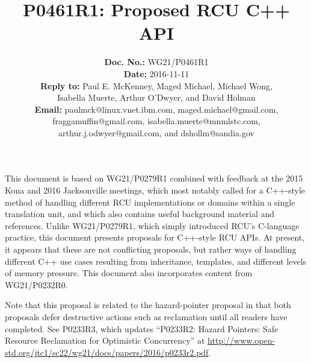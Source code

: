 \documentclass[letterpaper,10pt]{article}
\begin{document}
\newcommand{\co}[1]{\lstinline[breaklines=yes,breakatwhitespace=yes]{#1}}

\title{P0461R1: Proposed RCU C++ API}

\author{
{\bf Doc. No.: } WG21/P0461R1 \\
{\bf Date: } 2016-11-11 \\
{\bf Reply to: } Paul E. McKenney, Maged Michael, Michael Wong,\\
Isabella Muerte, Arthur O'Dwyer, and David Holman \\
{\bf Email: } paulmck@linux.vnet.ibm.com, maged.michael@gmail.com, \\
fraggamuffin@gmail.com, isabella.muerte@mnmlstc.com, \\
arthur.j.odwyer@gmail.com, and dshollm@sandia.gov
} %


\pagestyle{myheadings}

\maketitle


This document is based on WG21/P0279R1 combined with feedback at
the 2015 Kona and 2016 Jacksonville meetings, which most notably called
for a C++-style method of handling different RCU implementations or
domains within a single translation unit, and which also contains
useful background material and references.
Unlike WG21/P0279R1, which simply introduced RCU's C-language practice,
this document presents proposals for C++-style RCU APIs.
At present, it appears that these are not conflicting proposals, but
rather ways of handling different C++ use cases resulting from
inheritance, templates, and different levels of memory pressure.
This document also incorporates content from
WG21/P0232R0\cite{PaulEMcKennneyToolKitP0232R0}.

Note that this proposal is related to the hazard-pointer proposal in
that both proposals defer destructive actions such as reclamation until
all readers have completed.
See P0233R3, which updates ``P0233R2: Hazard Pointers:
Safe Resource Reclamation for Optimistic Concurrency''
at \url{http://www.open-std.org/jtc1/sc22/wg21/docs/papers/2016/p0233r2.pdf}.
\end{document}
